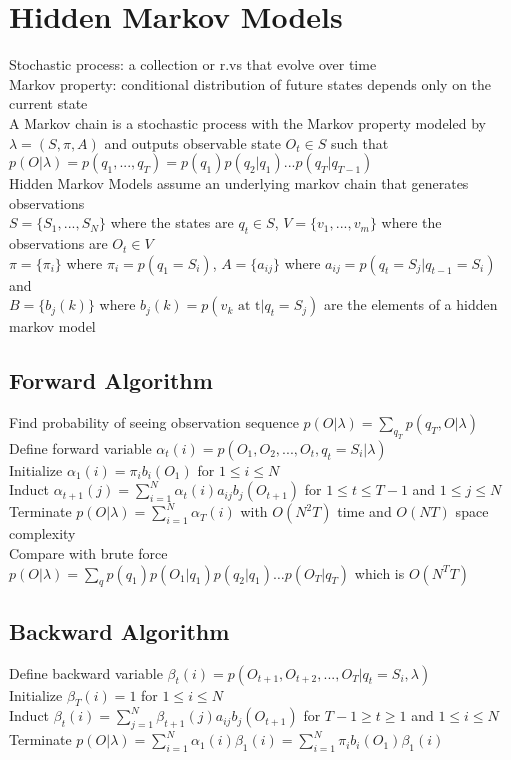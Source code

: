 \documentclass{article}
\renewcommand{\P}{p}
\begin{document}
\newpage
\section{Hidden Markov Models}
Stochastic process: a collection or r.vs that evolve over time \\
Markov property: conditional distribution of future states depends only on the current state \\
A Markov chain is a stochastic process with the Markov property modeled by $\lambda = (S, \pi, A)$ and outputs observable state $O_t \in S$ such that $\P(O | \lambda) = \P(q_1, ..., q_T) = \P(q_1)\P(q_2 | q_1)...\P(q_T | q_{T-1})$ \\
Hidden Markov Models assume an underlying markov chain that generates observations   \\
$S = \{S_1, ..., S_N\}$ where the states are $q_t \in S$, $V = \{v_1, ..., v_m\}$ where the observations are $O_t \in V$ \\
$\pi = \{\pi_i\}$ where $\pi_i = \P(q_1 = S_i)$, $A = \{a_{ij}\}$ where $a_{ij} = \P(q_t = S_j | q_{t-1} = S_i)$ and \\
$B = \{b_j(k)\}$ where $b_j(k) = \P(v_k \mbox{ at t} | q_t = S_j)$ are the elements of a hidden markov model

\subsection{Forward Algorithm}
Find probability of seeing observation sequence $p(O|\lambda) = \sum_{q_T} p(q_T, O | \lambda)$  \\
Define forward variable $\alpha_t(i) = \P(O_1, O_2, ..., O_t, q_t = S_i | \lambda)$ \\
Initialize $\alpha_1(i) = \pi_i b_i(O_1)$ for $1 \leq i \leq N$ \\
Induct $\alpha_{t+1}(j) = \sum_{i=1}^N \alpha_t(i)a_{ij} b_j(O_{t+1})$ for $1 \leq t \leq T -1$ and $1 \leq j \leq N$ \\
Terminate $\P(O | \lambda) = \sum_{i=1}^N \alpha_T(i)$ with $O(N^2T)$ time and $O(NT)$ space complexity \\
Compare with brute force $p(O|\lambda) =\sum_q p(q_1)p(O_1|q_1)p(q_2|q_1) \ldots p(O_T|q_T)$ which is $O(N^TT)$

\subsection{Backward Algorithm}
Define backward variable $\beta_t(i) = \P(O_{t+1}, O_{t+2}, ..., O_T | q_t = S_i, \lambda)$ \\
Initialize $\beta_T(i) = 1$ for $1 \leq i \leq N$ \\
Induct $\beta_{t}(i) = \sum_{j=1}^N \beta_{t+1}(j) a_{ij} b_j(O_{t+1})$ for $T-1 \geq t \geq 1$ and $1 \leq i \leq N$ \\
Terminate $p(O | \lambda) = \sum_{i=1}^N \alpha_1(i)\beta_1(i) = \sum_{i=1}^N  \pi_i b_i(O_1) \beta_1(i)$
\end{document}

